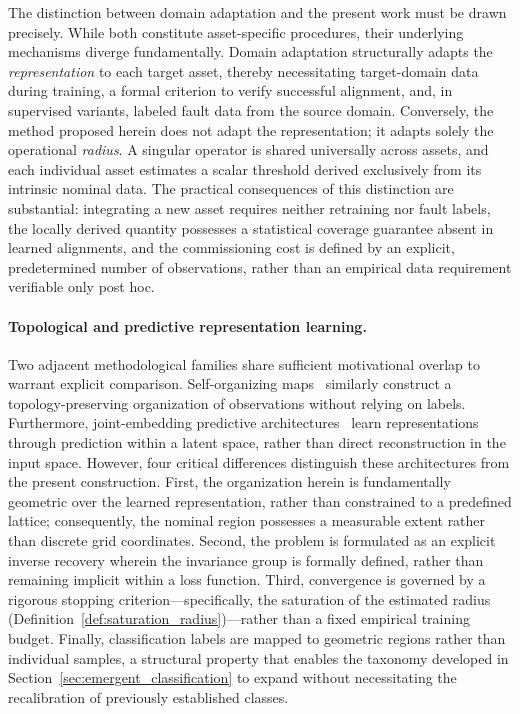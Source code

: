\documentclass[a4paper]{cas-sc}
\begin{document}
The distinction between domain adaptation and the present work must be drawn precisely. While both constitute asset-specific procedures, their underlying mechanisms diverge fundamentally. Domain adaptation structurally adapts the \emph{representation} to each target asset, thereby necessitating target-domain data during training, a formal criterion to verify successful alignment, and, in supervised variants, labeled fault data from the source domain. Conversely, the method proposed herein does not adapt the representation; it adapts solely the operational \emph{radius}. A singular operator is shared universally across assets, and each individual asset estimates a scalar threshold derived exclusively from its intrinsic nominal data. The practical consequences of this distinction are substantial: integrating a new asset requires neither retraining nor fault labels, the locally derived quantity possesses a statistical coverage guarantee absent in learned alignments, and the commissioning cost is defined by an explicit, predetermined number of observations, rather than an empirical data requirement verifiable only post hoc.

\paragraph{Topological and predictive representation learning.}
Two adjacent methodological families share sufficient motivational overlap to warrant explicit comparison. Self-organizing maps~\citep{kohonen1982} similarly construct a topology-preserving organization of observations without relying on labels. Furthermore, joint-embedding predictive architectures~\citep{assran2023} learn representations through prediction within a latent space, rather than direct reconstruction in the input space. However, four critical differences distinguish these architectures from the present construction. First, the organization herein is fundamentally geometric over the learned representation, rather than constrained to a predefined lattice; consequently, the nominal region possesses a measurable extent rather than discrete grid coordinates. Second, the problem is formulated as an explicit inverse recovery wherein the invariance group is formally defined, rather than remaining implicit within a loss function. Third, convergence is governed by a rigorous stopping criterion---specifically, the saturation of the estimated radius (Definition~\ref{def:saturation_radius})---rather than a fixed empirical training budget. Finally, classification labels are mapped to geometric regions rather than individual samples, a structural property that enables the taxonomy developed in Section~\ref{sec:emergent_classification} to expand without necessitating the recalibration of previously established classes.
\end{document}

